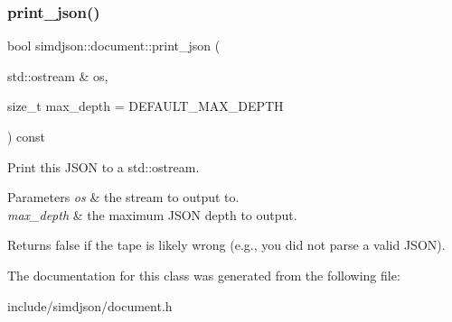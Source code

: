 \subsubsection{\texorpdfstring{print\+\_\+json()}{print\_json()}}
{\footnotesize\ttfamily bool simdjson\+::document\+::print\+\_\+json (\begin{DoxyParamCaption}\item[{std\+::ostream \&}]{os,  }\item[{size\+\_\+t}]{max\+\_\+depth = {\ttfamily DEFAULT\+\_\+MAX\+\_\+DEPTH} }\end{DoxyParamCaption}) const\hspace{0.3cm}{\ttfamily [noexcept]}}



Print this J\+S\+ON to a std\+::ostream. 


\begin{DoxyParams}{Parameters}
{\em os} & the stream to output to. \\
\hline
{\em max\+\_\+depth} & the maximum J\+S\+ON depth to output. \\
\hline
\end{DoxyParams}
\begin{DoxyReturn}{Returns}
false if the tape is likely wrong (e.\+g., you did not parse a valid J\+S\+ON). 
\end{DoxyReturn}


The documentation for this class was generated from the following file\+:\begin{DoxyCompactItemize}
\item 
include/simdjson/document.\+h\end{DoxyCompactItemize}
